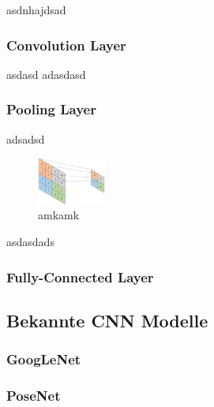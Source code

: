 asdnhajdsad
 
\subsubsection{Convolution Layer}
asdasd
adasdasd
\subsubsection{Pooling Layer}
adsadsd


\begin{figure}
	\centering
	\includegraphics[width=0.2\textwidth]{images/max_pool.png}
	\caption{amkamk}
	\label{fig:pooling_layer}
\end{figure}

asdasdads
\subsubsection{Fully-Connected Layer}
\subsection{Bekannte CNN Modelle}
\subsubsection{GoogLeNet}
\subsubsection{PoseNet}

\pagebreak